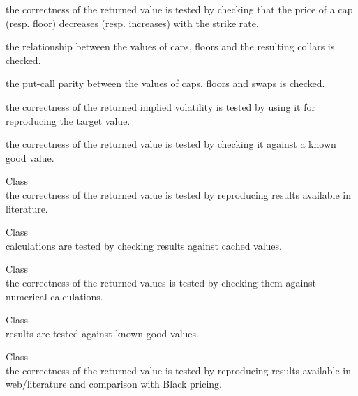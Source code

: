 \begin{DoxyRefList}
\begin{DoxyItemize}
\item the correctness of the returned value is tested by checking that the price of a cap (resp. floor) decreases (resp. increases) with the strike rate.
\item the relationship between the values of caps, floors and the resulting collars is checked.
\item the put-\/call parity between the values of caps, floors and swaps is checked.
\item the correctness of the returned implied volatility is tested by using it for reproducing the target value.
\item the correctness of the returned value is tested by checking it against a known good value. 
\end{DoxyItemize}
\item[Class \doxylink{class_quant_lib_1_1_choi_basket_engine}{Quant\+Lib\+::Choi\+Basket\+Engine} ]\hfill \\
\label{test__test000110}%
%
the correctness of the returned value is tested by reproducing results available in literature.  
\item[Class \doxylink{class_quant_lib_1_1_cms_rate_bond}{Quant\+Lib\+::Cms\+Rate\+Bond} ]\hfill \\
\label{test__test000019}%
%
calculations are tested by checking results against cached values.  
\item[Class \doxylink{class_quant_lib_1_1_composite_quote}{Quant\+Lib\+::Composite\+Quote\texorpdfstring{$<$}{<} Binary\+Function \texorpdfstring{$>$}{>}} ]\hfill \\
\label{test__test000162}%
%
the correctness of the returned values is tested by checking them against numerical calculations.  
\item[Class \doxylink{class_quant_lib_1_1_convergence_statistics}{Quant\+Lib\+::Convergence\+Statistics\texorpdfstring{$<$}{<} T, U \texorpdfstring{$>$}{>}} ]\hfill \\
\label{test__test000076}%
%
results are tested against known good values.  
\item[Class \doxylink{class_quant_lib_1_1_c_o_s_heston_engine}{Quant\+Lib\+::COSHeston\+Engine} ]\hfill \\
\label{test__test000149}%
%
the correctness of the returned value is tested by reproducing results available in web/literature and comparison with Black pricing.  

\end{DoxyRefList}
